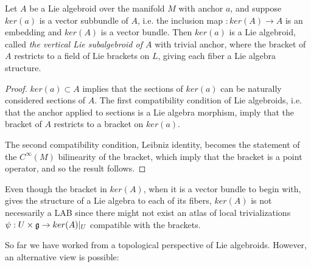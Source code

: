 \begin{theorem} \label{theoFiberLie}
Let $A$ be a Lie algebroid over the manifold $M$ with anchor $a$, and suppose $ker(a)$ is a vector subbundle of $A$, i.e. the inclusion map $:ker(A) \to A$ is an embedding and $ker(A)$ is a vector bundle. Then $ker(a)$ %
is a Lie algebroid, called \emph{the vertical Lie subalgebroid of $A$} with trivial anchor, where the bracket of $A$ restricts to a field of Lie brackets on $L$, giving each fiber a Lie algebra structure.
\end{theorem}

\begin{proof}
$ker(a) \subset A$ implies that the sections of $ker(a)$ can be naturally considered sections of $A$. The first compatibility condition of Lie algebroids, i.e. that the anchor applied to sections is a Lie algebra morphism, imply that the bracket of $A$ restricts to a bracket on $ker(a)$.

The second compatibility condition, Leibniz identity, becomes the statement of the $C^\infty(M)$ bilinearity of the bracket, which imply that the bracket is a point operator, and so the result follows.
\end{proof}

\begin{remark}
Even though the bracket in $ker(A)$, when it is a vector bundle to begin with, gives the structure of a Lie algebra to each of its fibers, $ker(A)$ is not necessarily a LAB since there might not exist an atlas of local trivializations $\psi: U \times \mathfrak{g} \to ker(A)|_U$ compatible with the brackets.
\end{remark}

So far we have worked from a topological perspective of Lie algebroids. However, an alternative view is possible:


